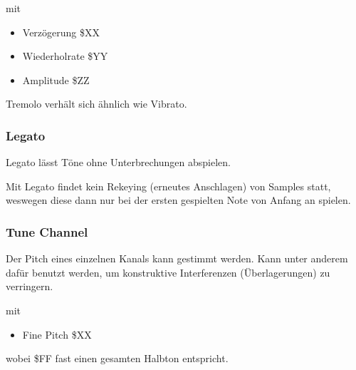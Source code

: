 \medskip



\medskip

mit

\begin{itemize}
	\item Verzögerung \$XX
	\item Wiederholrate \$YY
	\item Amplitude \$ZZ
\end{itemize}

Tremolo verhält sich ähnlich wie Vibrato.


\subsubsection{Legato}

Legato lässt Töne ohne Unterbrechungen abspielen.

\medskip



\medskip

Mit Legato findet kein Rekeying (erneutes Anschlagen) von Samples statt, weswegen diese dann nur bei der ersten gespielten Note von Anfang an spielen.


\subsubsection{Tune Channel}

Der Pitch eines einzelnen Kanals kann gestimmt werden. Kann unter anderem dafür benutzt werden, um konstruktive Interferenzen (Überlagerungen) zu verringern.

\medskip



\medskip

mit

\begin{itemize}
	\item Fine Pitch \$XX
\end{itemize}

wobei \$FF fast einen gesamten Halbton entspricht.

